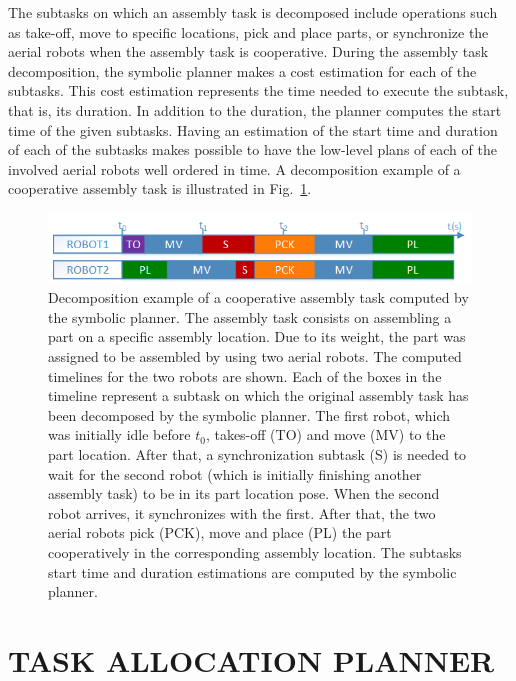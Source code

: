 \documentclass[letterpaper, 10 pt, conference]{ieeeconf}  %
\begin{document}
The subtasks on which an assembly task is decomposed include operations such as take-off, move to specific locations, pick and place parts, or synchronize the aerial robots when the assembly task is cooperative. During the assembly task decomposition, the symbolic planner makes a cost estimation for each of the subtasks. This cost estimation represents the time needed to execute the subtask, that is, its duration. In addition to the duration, the planner computes the start time of the given subtasks. Having an estimation of the start time and duration of each of the subtasks makes possible to have the low-level plans of each of the involved aerial robots well ordered in time. A decomposition example of a cooperative assembly task is illustrated in Fig.~\ref{fig:timelines}.

	\begin{figure}
   		\centering
   		\includegraphics[width=0.99\columnwidth]{timeline.png}
   		\caption[Decomposition example of a cooperative assembly task.]{Decomposition example of a cooperative assembly task computed by the symbolic planner. The assembly task consists on assembling a part on a specific assembly location. Due to its weight, the part was assigned to be assembled by using two aerial robots. The computed timelines for the two robots are shown. Each of the boxes in the timeline represent a subtask on which the original assembly task has been decomposed by the symbolic planner. The first robot, which was initially idle before $t_0$, takes-off (TO) and move (MV) to the part location. After that, a synchronization subtask (S) is needed to wait for the second robot (which is initially finishing another assembly task) to be in its part location pose. When the second robot arrives, it synchronizes with the first. After that, the two aerial robots pick (PCK), move and place (PL) the part cooperatively in the corresponding assembly location. The subtasks start time and duration estimations are computed by the symbolic planner.}
   		\label{fig:timelines}
	\end{figure}

\section{TASK ALLOCATION PLANNER}
\label{sec:tap}
\end{document}
